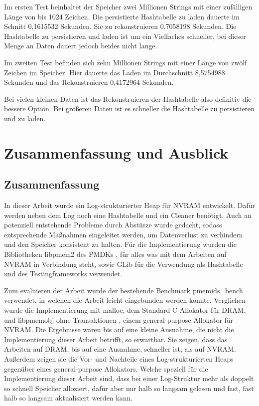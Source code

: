 \documentclass{class/thesis}
\begin{document}
\begin{thesis}
	Im ersten Test beinhaltet der Speicher zwei Millionen Strings mit einer zufälligen Länge von bis 1024 Zeichen.
	Die persistierte Hashtabelle zu laden dauerte im Schnitt 0,1615532 Sekunden. Sie zu rekonstruieren 0,7058198 Sekunden.
	Die Hashtabelle zu persistieren und laden ist um ein Vielfaches schneller, bei dieser Menge an Daten dauert jedoch beides nicht lange.
	
	Im zweiten Test befinden sich zehn Millionen Strings mit einer Länge von zwölf Zeichen im Speicher.
	Hier dauerte das Laden im Durchschnitt 8,5754988 Sekunden und das Rekonstruieren 0,4172964 Sekunden.
	
	Bei vielen kleinen Daten ist das Rekonstruieren der Hashtabelle also definitiv die bessere Option.
	Bei größeren Daten ist es schneller die Hashtabelle zu persistieren und zu laden.
	
	
	
	\chapter{Zusammenfassung und Ausblick}
	
	\section{Zusammenfassung}
	
	In dieser Arbeit wurde ein Log-strukturierter Heap für NVRAM entwickelt. Dafür werden neben dem Log noch eine Hashtabelle und ein Cleaner benötigt.
	Auch an potenziell entstehende Probleme durch Abstürze wurde gedacht, sodass entsprechende Maßnahmen eingeleitet werden, um Datenverlust zu verhindern und den Speicher konsistent zu halten.
	Für die Implementierung wurden die Bibliotheken libpmem2 des PMDKs \cite{PMDK:Docs}, für alles was mit dem Arbeiten auf NVRAM in Verbindung steht, sowie GLib \cite{GLib} für die Verwendung als Hashtabelle und des Testingframeworks verwendet.
	
	Zum evaluieren der Arbeit wurde der bestehende Benchmark pmemids\_bench \cite{Bench:Git} verwendet, in welchen die Arbeit leicht eingebunden werden konnte. Verglichen wurde die Implementierung mit malloc, dem Standard C Allokator für DRAM, und libpmemobj ohne Transaktionen \cite{PMDK:Docs}, einem general-purpose Allokator für NVRAM.
	Die Ergebnisse waren bis auf eine kleine Ausnahme, die nicht die Implementierung dieser Arbeit betrifft, so erwartbar. Sie zeigen, dass das Arbeiten auf DRAM, bis auf eine Ausnahme, schneller ist, als auf NVRAM.
	Außerdem zeigen sie die Vor- und Nachteile eines Log-strukturierten Heaps gegenüber eines general-purpose Allokators. 
	Welche speziell für die Implementierung dieser Arbeit sind, dass bei einer Log-Struktur mehr als doppelt so schnell Speicher alloziert, dafür aber nur halb so langsam gelesen und fast, fast halb so langsam aktualisiert werden kann.
	

\end{thesis}
\end{document}
